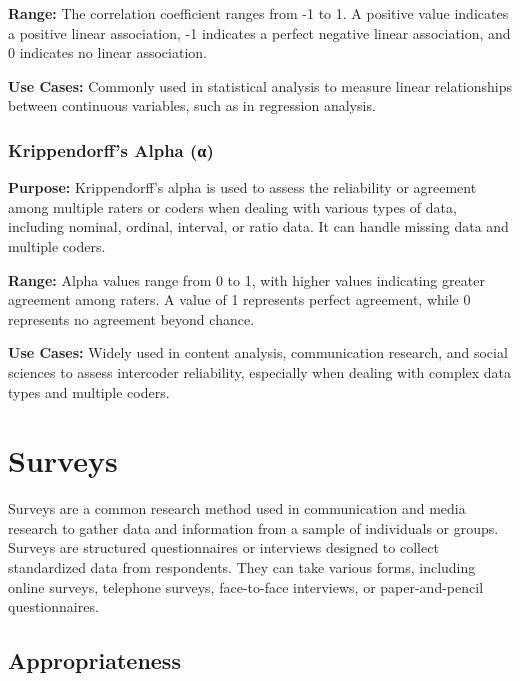 \documentclass[
  b5paper]{book}
\begin{document}
\textbf{Range:} The correlation coefficient ranges from -1 to 1. A positive value indicates a positive linear association, -1 indicates a perfect negative linear association, and 0 indicates no linear association.

\textbf{Use Cases:} Commonly used in statistical analysis to measure linear relationships between continuous variables, such as in regression analysis.

\hypertarget{krippendorffs-alpha-ux3b1}{%
\subsection*{\texorpdfstring{\textbf{Krippendorff's Alpha (α)}}{Krippendorff's Alpha (α)}}\label{krippendorffs-alpha-ux3b1}}

\textbf{Purpose:} Krippendorff's alpha is used to assess the reliability or agreement among multiple raters or coders when dealing with various types of data, including nominal, ordinal, interval, or ratio data. It can handle missing data and multiple coders.

\textbf{Range:} Alpha values range from 0 to 1, with higher values indicating greater agreement among raters. A value of 1 represents perfect agreement, while 0 represents no agreement beyond chance.

\textbf{Use Cases:} Widely used in content analysis, communication research, and social sciences to assess intercoder reliability, especially when dealing with complex data types and multiple coders.

\hypertarget{surveys-1}{%
\chapter{Surveys}\label{surveys-1}}

Surveys are a common research method used in communication and media research to gather data and information from a sample of individuals or groups.
Surveys are structured questionnaires or interviews designed to collect standardized data from respondents.
They can take various forms, including online surveys, telephone surveys, face-to-face interviews, or paper-and-pencil questionnaires.

\hypertarget{appropriateness}{%
\section{Appropriateness}\label{appropriateness}}
\end{document}

